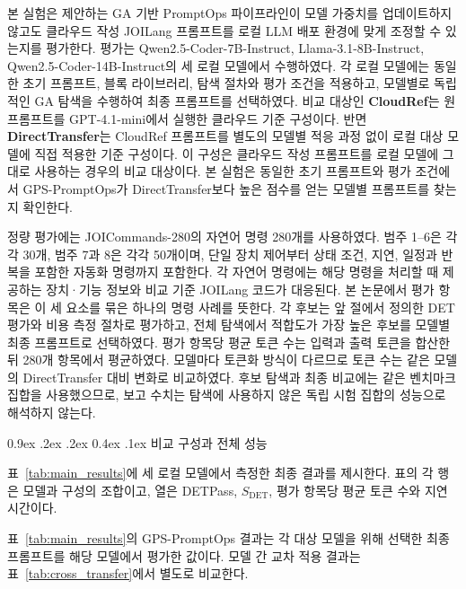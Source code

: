 \documentclass[10pt,twocolumn]{article}
\makeatletter
\newcommand{\sdet}{\ensuremath{S_{\mathrm{DET}}}}
\newenvironment{revision}{\begingroup\color{revisionblue}}{\endgroup}
\renewcommand{\subsection}{\@startsection{subsection}{2}{\z@}%
{0.9ex \@plus .2ex \@minus .2ex}%
{0.4ex \@plus .1ex}%
{\normalfont\normalsize\bfseries}}
\makeatother
\begin{document}
본 실험은 제안하는 GA 기반 PromptOps 파이프라인이 모델 가중치를 업데이트하지 않고도 클라우드 작성 JOILang 프롬프트를 로컬 LLM 배포 환경에 맞게 조정할 수 있는지를 평가한다. 평가는 Qwen2.5-Coder-7B-Instruct, Llama-3.1-8B-Instruct, Qwen2.5-Coder-14B-Instruct의 세 로컬 모델에서 수행하였다. 각 로컬 모델에는 동일한 초기 프롬프트, 블록 라이브러리, 탐색 절차와 평가 조건을 적용하고, 모델별로 독립적인 GA 탐색을 수행하여 최종 프롬프트를 선택하였다. 비교 대상인 \textbf{CloudRef}는 원 프롬프트를 GPT-4.1-mini에서 실행한 클라우드 기준 구성이다. 반면 \textbf{DirectTransfer}는 CloudRef 프롬프트를 별도의 모델별 적응 과정 없이 로컬 대상 모델에 직접 적용한 기준 구성이다. 이 구성은 클라우드 작성 프롬프트를 로컬 모델에 그대로 사용하는 경우의 비교 대상이다.
\begin{revision}
본 실험은 동일한 초기 프롬프트와 평가 조건에서 GPS-PromptOps가 DirectTransfer보다 높은 점수를 얻는 모델별 프롬프트를 찾는지 확인한다.
\end{revision}

\begin{revision}
정량 평가에는 JOICommands-280의 자연어 명령 280개를 사용하였다. 범주 1--6은 각각 30개, 범주 7과 8은 각각 50개이며, 단일 장치 제어부터 상태 조건, 지연, 일정과 반복을 포함한 자동화 명령까지 포함한다. 각 자연어 명령에는 해당 명령을 처리할 때 제공하는 장치·기능 정보와 비교 기준 JOILang 코드가 대응된다. 본 논문에서 평가 항목은 이 세 요소를 묶은 하나의 명령 사례를 뜻한다. 각 후보는 앞 절에서 정의한 DET 평가와 비용 측정 절차로 평가하고, 전체 탐색에서 적합도가 가장 높은 후보를 모델별 최종 프롬프트로 선택하였다. 평가 항목당 평균 토큰 수는 입력과 출력 토큰을 합산한 뒤 280개 항목에서 평균하였다. 모델마다 토큰화 방식이 다르므로 토큰 수는 같은 모델의 DirectTransfer 대비 변화로 비교하였다. 후보 탐색과 최종 비교에는 같은 벤치마크 집합을 사용했으므로, 보고 수치는 탐색에 사용하지 않은 독립 시험 집합의 성능으로 해석하지 않는다.
\end{revision}

\subsection{비교 구성과 전체 성능}

표~\ref{tab:main_results}에 세 로컬 모델에서 측정한 최종 결과를 제시한다. 표의 각 행은 모델과 구성의 조합이고, 열은 DETPass, \sdet{}, 평가 항목당 평균 토큰 수와 지연 시간이다.

표~\ref{tab:main_results}의 GPS-PromptOps 결과는 각 대상 모델을 위해 선택한 최종 프롬프트를 해당 모델에서 평가한 값이다. 모델 간 교차 적용 결과는 표~\ref{tab:cross_transfer}에서 별도로 비교한다.
\end{document}
